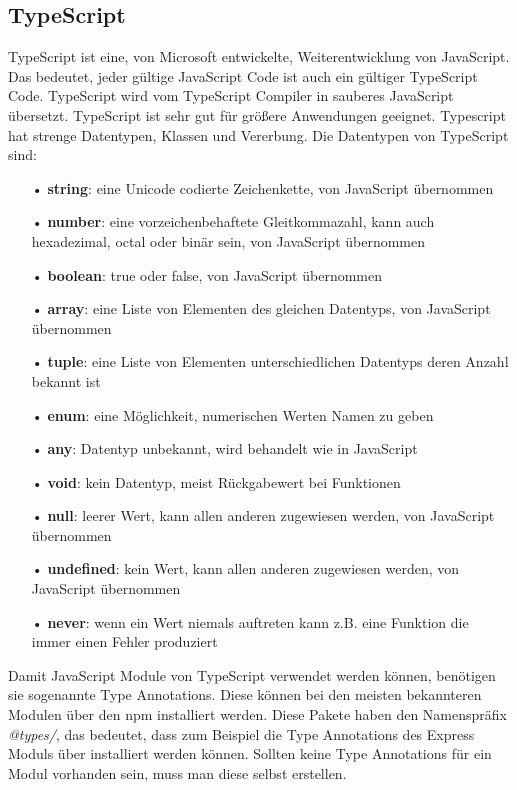 \subsection{TypeScript}
\label{sec:vor-ts}
TypeScript ist eine, von Microsoft entwickelte, Weiterentwicklung von JavaScript. Das bedeutet, jeder gültige JavaScript Code ist auch ein gültiger TypeScript Code. TypeScript wird vom TypeScript Compiler in sauberes JavaScript übersetzt. TypeScript ist sehr gut für größere Anwendungen geeignet. Typescript hat strenge Datentypen, Klassen und Vererbung. Die Datentypen von TypeScript sind:

\begin{itemize}
\item[•] \textbf{string}: eine Unicode codierte Zeichenkette, von JavaScript übernommen
\item[•] \textbf{number}: eine vorzeichenbehaftete Gleitkommazahl, kann auch hexadezimal, octal oder binär sein, von JavaScript übernommen
\item[•] \textbf{boolean}: true oder false, von JavaScript übernommen
\item[•] \textbf{array}: eine Liste von Elementen des gleichen Datentyps, von JavaScript übernommen
\item[•] \textbf{tuple}: eine Liste von Elementen unterschiedlichen Datentyps deren Anzahl bekannt ist
\item[•] \textbf{enum}: eine Möglichkeit, numerischen Werten Namen zu geben
\item[•] \textbf{any}: Datentyp unbekannt, wird behandelt wie in JavaScript
\item[•] \textbf{void}: kein Datentyp, meist Rückgabewert bei Funktionen
\item[•] \textbf{null}: leerer Wert, kann allen anderen zugewiesen werden, von JavaScript übernommen
\item[•] \textbf{undefined}: kein Wert, kann allen anderen zugewiesen werden, von JavaScript übernommen
\item[•] \textbf{never}: wenn ein Wert niemals auftreten kann z.B. eine Funktion die immer einen Fehler produziert
\end{itemize}

Damit JavaScript Module von TypeScript verwendet werden können, benötigen sie sogenannte Type Annotations. Diese können bei den meisten bekannteren Modulen über den \ac{npm} installiert werden. Diese Pakete haben den Namenspräfix \textit{@types/}, das bedeutet, dass zum Beispiel die Type Annotations des Express Moduls über  installiert werden können. Sollten keine Type Annotations für ein Modul vorhanden sein, muss man diese selbst erstellen.


